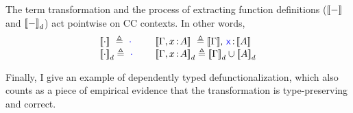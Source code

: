 The term transformation and the process of extracting function definitions (${[\![ - ]\!]}$ and ${[\![ - ]\!]}_d$) act pointwise on CC contexts. In other words,
\begin{equation*}
\begin{array}{l @{\qquad} l}
	\bbracket{\cdot}\ \triangleq\ \target{\cdot}\  & \bbracket{\Gamma, x \goodcolon A}\ \triangleq \bbracket{\Gamma}\sfcomma \target{x} \goodcolon \bbracket{A}\\
	\bbracket{\cdot}_d \triangleq\ \target{\cdot}\  & \bbracket{\Gamma, x \goodcolon A}_d \triangleq \bbracket{\Gamma}_d\cup\bbracket{A}_d\\
\end{array}
\end{equation*}

Finally, I give an example of dependently typed defunctionalization, which also counts as a piece of empirical evidence that the transformation is type-preserving and correct.

